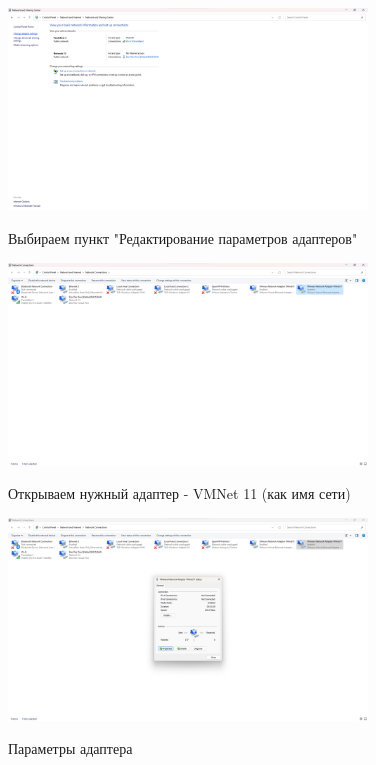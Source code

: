 \documentclass[a4paper]{article}
\begin{document}
  \begin{figure}[H]
    \centering
    \includegraphics[width=0.85\textwidth]{06_00 (46)}
    \label{img:46}
    \caption{Выбираем пункт "Редактирование параметров адаптеров"}
  \end{figure}
  
  \begin{figure}[H]
    \centering
    \includegraphics[width=0.85\textwidth]{06_00 (47)}
    \label{img:47}
    \caption{Открываем нужный адаптер - VMNet 11 (как имя сети)}
  \end{figure}
  
  \begin{figure}[H]
    \centering
    \includegraphics[width=0.85\textwidth]{06_00 (48)}
    \label{img:48}
    \caption{Параметры адаптера}
  \end{figure}
  
\end{document}

